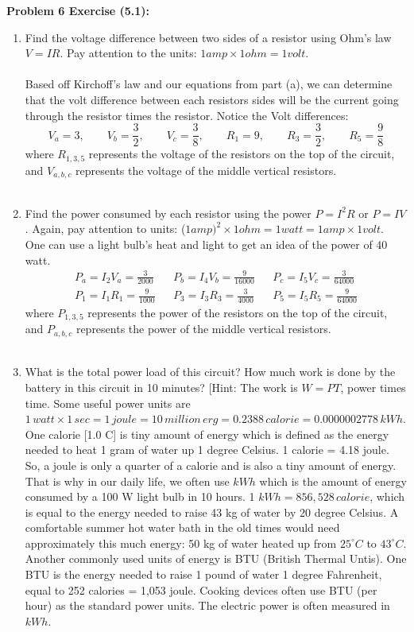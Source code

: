 \documentclass[11pt]{article}
\newenvironment{problem}[1]{\textbf{Problem #1: }}{\newpage}
\begin{document}
\begin{problem}{6 Exercise (5.1)}
\begin{enumerate}[label = (\alph*)]
			\newpage
			\item Find the voltage difference between two sides of a resistor using Ohm’s law $V = IR$. Pay attention to the units: $1 amp \times 1 ohm = 1 volt$.
			\\ \\
			Based off Kirchoff's law and our equations from part (a), we can determine that the volt difference between each resistors sides will be the current going through the resistor times the resistor. Notice the Volt differences:
			\[V_a = 3, \qquad V_b = \frac{3}{2}, \qquad V_c = \frac{3}{8}, \qquad R_1 = 9, \qquad R_3 = \frac{3}{2}, \qquad R_5 = \frac{9}{8}\]
			where $R_{1,3,5}$ represents the voltage of the resistors on the top of the circuit, and $V_{a,b,c}$ represents the voltage of the middle vertical resistors.
			\\ \\
			\item Find the power consumed by each resistor using the power $P = I^2R$ or $P = IV$. Again, pay attention to units: ($1 amp)^2 \times 1 ohm = 1 watt = 1 amp \times 1 volt$. One can use a light bulb’s heat and light to get an idea of the power of 40 watt.
			\begin{align*}
				P_a = I_2V_a = \frac{3}{2000} && P_b = I_4V_b = \frac{9}{16000} && P_c = I_5V_c = \frac{3}{64000} \\
				P_1 = I_1R_1 = \frac{9}{1000} &&  P_3 = I_3R_3 = \frac{3}{4000} &&  P_5 = I_5R_5 = \frac{9}{64000}
			\end{align*}
			where $P_{1,3,5}$ represents the power of the resistors on the top of the circuit, and $P_{a,b,c}$ represents the power of the middle vertical resistors.
			\\ \\
			\item What is the total power load of this circuit? How much work is done by the battery in this circuit in 10 minutes? [Hint: The work is $W = P T$, power times time.	Some useful power units are $1\,watt \times 1\,sec = 1\,joule = 10\,million\,erg = 0.2388\,calorie = 0.0000002778\,kW h$. One calorie [1.0 C] is tiny amount of energy	which is defined as the energy needed to heat 1 gram of water up 1 degree Celsius. 1 calorie = 4.18 joule. So, a joule is only a quarter of a calorie and is also a tiny amount of energy. That is why in our daily life, we often use $kWh$ which is the amount of energy consumed by a 100 W light bulb in 10 hours. 1 $kW h = 856,528\,calorie$, which is equal to the energy needed to raise 43 kg of water by 20 degree Celsius. A	comfortable summer hot water bath in the old times would need approximately this much energy: 50 kg of water heated up from $25^\circ C$ to $43^\circ C$. Another commonly used units of energy is BTU (British Thermal Untis). One BTU is the energy needed to	raise 1 pound of water 1 degree Fahrenheit, equal to 252 calories = 1,053 joule. Cooking devices often use BTU (per hour) as the standard power units. The electric power is often measured in $kWh$.

\end{enumerate}
\end{problem}
\end{document}
